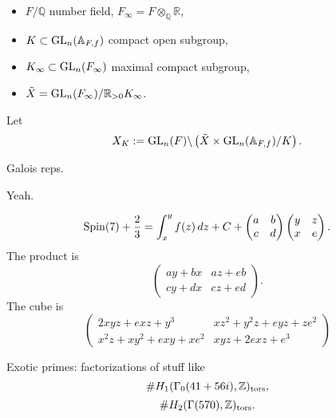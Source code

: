 \documentclass[reqno]{amsart} 
\begin{document}
\begin{itemize}
\item $F / \mathbb{Q}$ number field, $F _\infty = F \otimes_{\mathbb{Q}} \mathbb{R}$,
\item $K \subset \operatorname{GL}_n (\mathbb{A}_{F, f})$ compact open subgroup,
\item $K _\infty \subset \operatorname{GL}_n (F _\infty )$ maximal compact subgroup,
\item $\tilde{X} = \operatorname{GL}_n (F _\infty ) / \mathbb{R}_{> 0} K _\infty $.
\end{itemize}
Let
\begin{equation*}
X_K := \operatorname{GL}_n (F) \backslash \left( \tilde{X} \times \operatorname{GL}_n (\mathbb{A}_{F, f}) / K \right).
\end{equation*}
\begin{conjecture}\label{conjecture:cj45oak248}
  Galois reps.
\end{conjecture}
\begin{theorem}[Scholze]
  Yeah.
\end{theorem}

\begin{equation*}
\operatorname{Spin}(7) + \frac{2}{3} = \int_x^y f (z) \, d z + C +
\begin{pmatrix}
a & b \\
c & d \\
\end{pmatrix}
\begin{pmatrix}
y & z \\
x & e \\
\end{pmatrix}.
\end{equation*}
The product is
\begin{equation*}
\begin{pmatrix}a y + b x & a z + e b\\c y + d x & c z + e d\end{pmatrix}.
\end{equation*}
The cube is
\begin{equation*}
\begin{pmatrix}2 x y z + e x z + y^{3} & x z^{2} + y^{2} z + e y z + z e^{2}\\x^{2} z + x y^{2} + e x y + x e^{2} & x y z + 2 e x z + e^{3}\end{pmatrix}
\end{equation*}

Exotic primes: factorizations of stuff like
\begin{equation*}
\# H_1 (\Gamma_0 (41 + 56 i), \mathbb{Z})_{\operatorname{tors}},
\end{equation*}
\begin{equation*}
\# H_2 (\Gamma (570), \mathbb{Z})_{\operatorname{tors}}.
\end{equation*}
\end{document}
